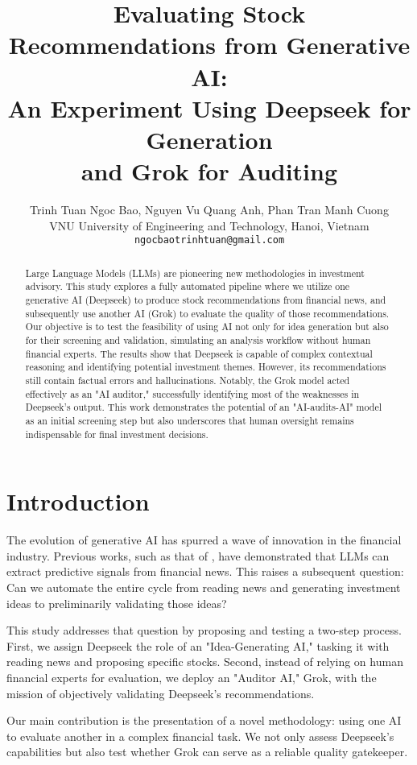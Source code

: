 \documentclass{article}
\title{Evaluating Stock Recommendations from Generative AI: \\ An Experiment Using Deepseek for Generation \\ and Grok for Auditing}
\author{
  Trinh Tuan Ngoc Bao,
  Nguyen Vu Quang Anh,
  Phan Tran Manh Cuong \\
  VNU University of Engineering and Technology, Hanoi, Vietnam\\
  \texttt{ngocbaotrinhtuan@gmail.com}
}
\begin{document}
\maketitle

\begin{abstract}
Large Language Models (LLMs) are pioneering new methodologies in investment advisory. This study explores a fully automated pipeline where we utilize one generative AI (Deepseek) to produce stock recommendations from financial news, and subsequently use another AI (Grok) to evaluate the quality of those recommendations. Our objective is to test the feasibility of using AI not only for idea generation but also for their screening and validation, simulating an analysis workflow without human financial experts. The results show that Deepseek is capable of complex contextual reasoning and identifying potential investment themes. However, its recommendations still contain factual errors and hallucinations. Notably, the Grok model acted effectively as an "AI auditor," successfully identifying most of the weaknesses in Deepseek's output. This work demonstrates the potential of an "AI-audits-AI" model as an initial screening step but also underscores that human oversight remains indispensable for final investment decisions.
\end{abstract}

\section{Introduction}

The evolution of generative AI has spurred a wave of innovation in the financial industry. Previous works, such as that of \citet{fang2023chatgpt}, have demonstrated that LLMs can extract predictive signals from financial news. This raises a subsequent question: Can we automate the entire cycle from reading news and generating investment ideas to preliminarily validating those ideas?

This study addresses that question by proposing and testing a two-step process. First, we assign Deepseek the role of an "Idea-Generating AI," tasking it with reading news and proposing specific stocks. Second, instead of relying on human financial experts for evaluation, we deploy an "Auditor AI," Grok, with the mission of objectively validating Deepseek's recommendations.

Our main contribution is the presentation of a novel methodology: using one AI to evaluate another in a complex financial task. We not only assess Deepseek's capabilities but also test whether Grok can serve as a reliable quality gatekeeper.
\end{document}

